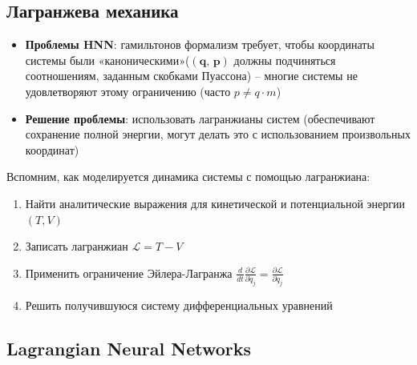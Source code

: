 \subsection{Лагранжева механика}
\begin{itemize}
	\item \textbf{Проблемы HNN}: гамильтонов формализм требует, чтобы координаты системы были «каноническими»($(\textbf{q, p})$ должны подчиняться соотношениям, заданным скобками Пуассона) -- многие системы не удовлетворяют этому ограничению (часто $p \neq q \cdot m$)
	\item \textbf{Решение проблемы}: использовать лагранжианы систем (обеспечивают сохранение полной энергии, могут делать это с использованием произвольных координат)
\end{itemize}

Вспомним, как моделируется динамика системы с помощью лагранжиана:
\begin{enumerate}
	\item Найти аналитические выражения для кинетической и потенциальной энергии $(T, V )$
	\item Записать лагранжиан $\mathcal{L} = T - V $
	\item Применить ограничение Эйлера-Лагранжа $\frac{d}{d t} \frac{\partial \mathcal{L}}{\partial \dot{q}_{j}} =\frac{\partial \mathcal{L}}{\partial q_{j}} $
	\item Решить получившуюся систему дифференциальных уравнений
\end{enumerate}

\subsection{Lagrangian Neural Networks}


